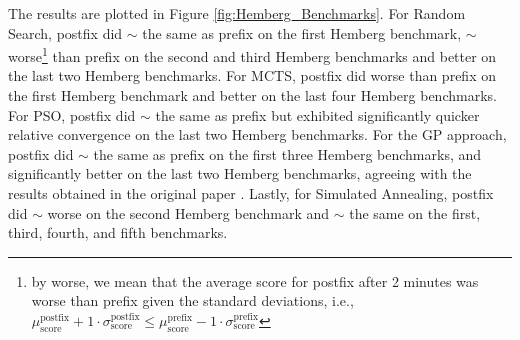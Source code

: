 \documentclass[runningheads]{llncs}
\begin{document}
The results are plotted in Figure \ref{fig:Hemberg_Benchmarks}. For Random Search, postfix did $\sim$ the same as prefix on the first Hemberg benchmark, $\sim$ worse\footnote{by worse, we mean that the average score for postfix after 2 minutes was worse than prefix given the standard deviations, i.e., $\mu_\mathrm{score}^\mathrm{postfix} + 1\cdot \sigma_\mathrm{score}^\mathrm{postfix} \leq \mu_\mathrm{score}^\mathrm{prefix} - 1\cdot \sigma_\mathrm{score}^\mathrm{prefix}$} than prefix on the second and third Hemberg benchmarks and better on the last two Hemberg benchmarks. For MCTS, postfix did worse than prefix on the first Hemberg benchmark and better on the last four Hemberg benchmarks. For PSO, postfix did $\sim$ the same as prefix but exhibited significantly quicker relative convergence on the last two Hemberg benchmarks. For the GP approach, postfix did $\sim$ the same as prefix on the first three Hemberg benchmarks, and significantly better on the last two Hemberg benchmarks, agreeing with the results obtained in the original paper \cite{hemberg2008pre}. Lastly, for Simulated Annealing, postfix did $\sim$ worse on the second Hemberg benchmark and $\sim$ the same on the first, third, fourth, and fifth benchmarks. 
\end{document}
